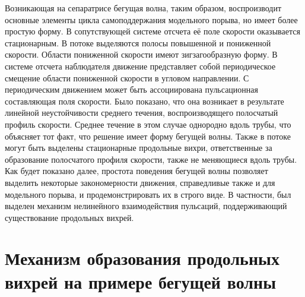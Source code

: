Возникающая на сепаратрисе бегущая волна, таким образом, воспроизводит основные элементы цикла самоподдержания модельного порыва, но имеет более простую форму. В сопутствующей системе отсчета её поле скорости оказывается стационарным. В потоке выделяются полосы повышенной и пониженной скорости. Области пониженной скорости имеют зигзагообразную форму. В системе отсчета наблюдателя движение представляет собой периодическое смещение области пониженной скорости в угловом направлении. С периодическим движением может быть ассоциирована пульсационная составляющая поля скорости. Было показано, что она возникает в результате линейной неустойчивости среднего течения, воспроизводящего полосчатый профиль скорости. Среднее течение в этом случае однородно вдоль трубы, что объясняет тот факт, что решение имеет форму бегущей волны. Также в потоке могут быть выделены стационарные продольные вихри, ответственные за образование полосчатого профиля скорости, также не меняющиеся вдоль трубы. Как будет показано далее, простота поведения бегущей волны позволяет выделить некоторые закономерности движения, справедливые также и для модельного порыва, и продемонстрировать их в строго виде. В частности, был выделен механизм нелинейного взаимодействия пульсаций, поддерживающий существование продольных вихрей. 


\section{Механизм образования продольных вихрей на примере бегущей волны}

